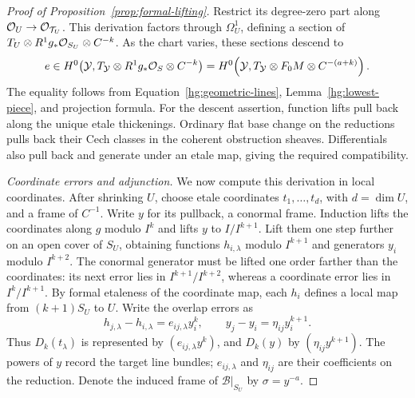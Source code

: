 \begin{proof}[Proof of Proposition~\ref{prop:formal-lifting}]
Restrict its degree-zero part along
\(\mathcal{O}_U\to\mathcal{O}_{\mathcal T_U}\).  This derivation factors
through \(\Omega_U^1\), defining a section of
\(T_U\otimes R^1g_*\mathcal{O}_{S_U}\otimes C^{-k}\).  As the chart
varies, these sections descend to
\begin{equation}\label{hg:obstruction-section}
 e\in H^0\!\left(
 \mathcal Y,T_{\mathcal Y}\otimes R^1g_*\mathcal{O}_S\otimes C^{-k}
 \right)
 =
 H^0\!\left(
 \mathcal Y,T_{\mathcal Y}\otimes F_0M\otimes C^{-(a+k)}
 \right).
\end{equation}
The equality follows from Equation~\eqref{hg:geometric-lines},
Lemma~\ref{hg:lowest-piece}, and projection formula.  For the
descent assertion, function lifts pull back along the unique
etale thickenings.  Ordinary flat base change on the reductions
pulls back their Cech classes in the coherent obstruction
sheaves.  Differentials also pull back and generate under an
etale map, giving the required compatibility.

\smallskip\noindent\emph{Coordinate errors and adjunction.}
We now compute this derivation in local coordinates.  After shrinking \(U\), choose etale coordinates
\(t_1,\ldots,t_d\), with \(d=\dim U\), and a frame of
\(C^{-1}\).  Write \(y\) for its pullback, a conormal frame.
Induction lifts the coordinates along \(g\) modulo \(I^k\)
and lifts \(y\) to \(I/I^{k+1}\).  Lift them one step further
on an open cover of \(S_U\), obtaining functions
\(h_{i,\lambda}\) modulo \(I^{k+1}\) and generators \(y_i\)
modulo \(I^{k+2}\).  The conormal generator must be lifted one
order farther than the coordinates: its next error lies in
\(I^{k+1}/I^{k+2}\), whereas a coordinate error lies in
\(I^k/I^{k+1}\).  By formal etaleness of the coordinate map,
each \(h_i\) defines a local map from \((k+1)S_U\) to \(U\).
Write the overlap errors as
\begin{equation}\label{hg:coordinate-errors}
 h_{j,\lambda}-h_{i,\lambda}
       =e_{ij,\lambda}y_i^k,
 \qquad
 y_j-y_i=\eta_{ij}y_i^{k+1}.
\end{equation}
Thus \(D_k(t_\lambda)\) is represented by
\((e_{ij,\lambda}y^k)\), and \(D_k(y)\) by
\((\eta_{ij}y^{k+1})\).  The powers of \(y\) record the
target line bundles; \(e_{ij,\lambda}\) and \(\eta_{ij}\)
are their coefficients on the reduction.  Denote the induced
frame of
\(\mathcal B|_{S_U}\) by \(\sigma=y^{-a}\).


\end{proof}
